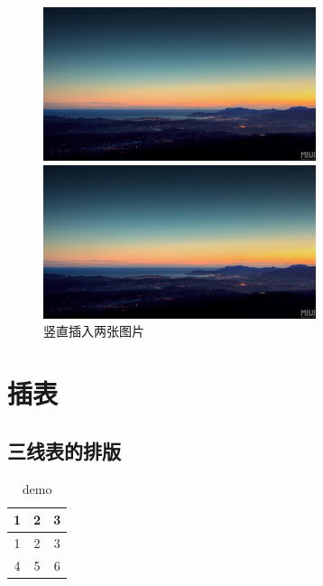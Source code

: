 \documentclass[12pt]{elegantpaper} %
\begin{document}
\begin{figure}	
    \centering	
	\begin{minipage}{0.5\textwidth}		
		\centering		
		\includegraphics[height=4.5cm]{figure/demo.jpg}		
	\end{minipage}
	
	\begin{minipage}{0.5\textwidth}		
		\centering		
		\includegraphics[height=4.5cm]{figure/demo.jpg}		
	\end{minipage}	
	\caption{竖直插入两张图片}	
\end{figure}


\newpage






\section{插表}
\subsection{三线表的排版}
\renewcommand{\tablename}{表}
\begin{table}[htbp]
	\centering
	\caption{demo}\label{table1}
	\begin{tabular}{ccc}    
		\toprule            
		1 & 2 & 3 \\        
		\midrule            
     	1 & 2 & 3 \\
        4 & 5 & 6 \\
		\bottomrule         
	\end{tabular}
\end{table}
\end{document}

